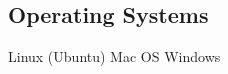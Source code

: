 \documentclass[]{deedy-resume-openfont}
\begin{document}
\begin{minipage}[t]{0.33\textwidth}
\subsection{Operating Systems}
Linux (Ubuntu) \textbullet{} Mac OS \textbullet{} Windows
\sectionsep

%
%

\end{minipage} 
\hfill
\end{document}
